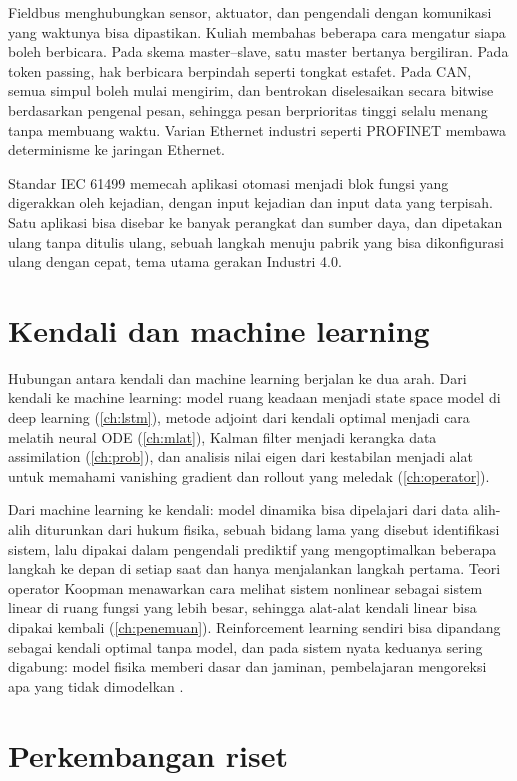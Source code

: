 Fieldbus menghubungkan sensor, aktuator, dan pengendali dengan komunikasi yang waktunya bisa dipastikan. Kuliah
membahas beberapa cara mengatur siapa boleh berbicara. Pada skema master--slave, satu master bertanya bergiliran.
Pada token passing, hak berbicara berpindah seperti tongkat estafet. Pada CAN, semua simpul boleh mulai mengirim,
dan bentrokan diselesaikan secara bitwise berdasarkan pengenal pesan, sehingga pesan berprioritas tinggi selalu
menang tanpa membuang waktu. Varian Ethernet industri seperti PROFINET membawa determinisme ke jaringan Ethernet.

Standar IEC 61499 memecah aplikasi otomasi menjadi blok fungsi yang digerakkan oleh kejadian, dengan input kejadian
dan input data yang terpisah. Satu aplikasi bisa disebar ke banyak perangkat dan sumber daya, dan dipetakan ulang
tanpa ditulis ulang, sebuah langkah menuju pabrik yang bisa dikonfigurasi ulang dengan cepat, tema utama gerakan
Industri 4.0.

\section{Kendali dan machine learning}

Hubungan antara kendali dan machine learning berjalan ke dua arah. Dari kendali ke machine learning: model ruang
keadaan menjadi state space model di deep learning (\cref{ch:lstm}), metode adjoint dari kendali optimal menjadi cara
melatih neural ODE (\cref{ch:mlat}), Kalman filter menjadi kerangka data assimilation (\cref{ch:prob}), dan analisis
nilai eigen dari kestabilan menjadi alat untuk memahami vanishing gradient dan rollout yang meledak
(\cref{ch:operator}).

Dari machine learning ke kendali: model dinamika bisa dipelajari dari data alih-alih diturunkan dari hukum fisika,
sebuah bidang lama yang disebut identifikasi sistem, lalu dipakai dalam pengendali prediktif yang mengoptimalkan
beberapa langkah ke depan di setiap saat dan hanya menjalankan langkah pertama. Teori operator Koopman
\citep{koopman1931} menawarkan cara melihat sistem nonlinear sebagai sistem linear di ruang fungsi yang lebih besar,
sehingga alat-alat kendali linear bisa dipakai kembali (\cref{ch:penemuan}). Reinforcement learning sendiri bisa
dipandang sebagai kendali optimal tanpa model, dan pada sistem nyata keduanya sering digabung: model fisika memberi
dasar dan jaminan, pembelajaran mengoreksi apa yang tidak dimodelkan \citep{brunton2022}.

\section{Perkembangan riset}

